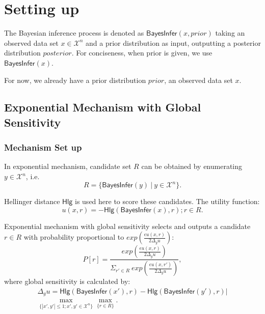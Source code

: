 \documentclass{article}
\begin{document}
\printAffiliationsAndNotice{\icmlEqualContribution} %

\begin{abstract}
\end{abstract}

\section{Setting up}
\label{sec_setup}
The Bayesian inference process is denoted as $\mathsf{BayesInfer}(x,prior)$ taking an observed data set $x \in \mathcal{X}^n$ and a prior distribution as input, outputting a posterior distribution $posterior$. For conciseness, when prior is given, we use $\mathsf{BayesInfer}(x)$.

For now, we already have a prior distribution $prior$, an observed data set $x$.

\subsection{Exponential Mechanism with Global Sensitivity}
\label{subsec_emgs}

\subsubsection{Mechanism Set up}
In exponential mechanism, candidate set $R$ can be obtained by enumerating $y \in \mathcal{X}^n$, i.e.
\begin{equation*}
R = \{\mathsf{BayesInfer}(y)\ |\ y \in \mathcal{X}^n\}.
\end{equation*}

Hellinger distance $\mathsf{Hlg}$ is used here to score these candidates. The utility function:
\begin{equation}
\label{equ_utility}
u(x,r) = -\mathsf{Hlg}(\mathsf{BayesInfer}(x), r); r \in R.
\end{equation}

Exponential mechanism with global sensitivity selects and outputs a candidate $r \in R$ with probability proportional to $exp(\frac{\epsilon u(x,r)}{2 \Delta_{g}u})$:
\begin{equation*}
P[r] = \frac
{exp(\frac{\epsilon u(x,r)}{2 \Delta_{g}u})}
{\Sigma_{r' \in R}\ exp(\frac{\epsilon u(x,r')}{2 \Delta_{g}u})},
\end{equation*}
where global sensitivity is calculated by:
\begin{multline*}
\Delta_{g}u = 
\mathsf{Hlg}(\mathsf{BayesInfer}(x'), r) - \mathsf{Hlg}(\mathsf{BayesInfer}(y'), r)|\\
\max_{\{|x',y'| \leq 1;x',y'\in \mathcal{X}^n\}}\max_{\{r\in R\}}.
\end{multline*}
\end{document}
